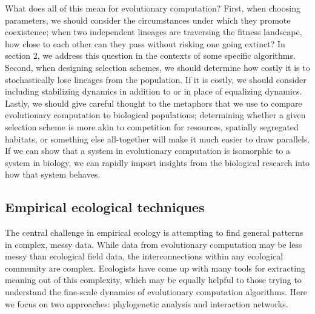 What does all of this mean for evolutionary computation? First, when choosing parameters, we should consider the circumstances under which they promote coexistence; when two independent lineages are traversing the fitness landscape, how close to each other can they pass without risking one going extinct? In section 2, we address this question in the contexts of some specific algorithms. Second, when designing selection schemes, we should determine how costly it is to stochastically lose lineages from the population. If it is costly, we should consider including stabilizing dynamics in addition to or in place of equalizing dynamics. Lastly, we should give careful thought to the metaphors that we use to compare evolutionary computation to biological populations; determining whether a given selection scheme is more akin to competition for resources, spatially segregated habitats, or something else all-together will make it much easier to draw parallels. If we can show that a system in evolutionary computation is isomorphic to a system in biology, we can rapidly import insights from the biological research into how that system behaves.

\subsection{Empirical ecological techniques}

The central challenge in empirical ecology is attempting to find general patterns  in complex, messy data. While data from evolutionary computation may be less messy than ecological field data, the interconnections within any ecological community are complex. Ecologists have come up with many tools for extracting meaning out of this complexity, which may be equally helpful to those trying to understand the fine-scale dynamics of evolutionary computation algorithms. Here we focus on two approaches: phylogenetic analysis and interaction networks.

